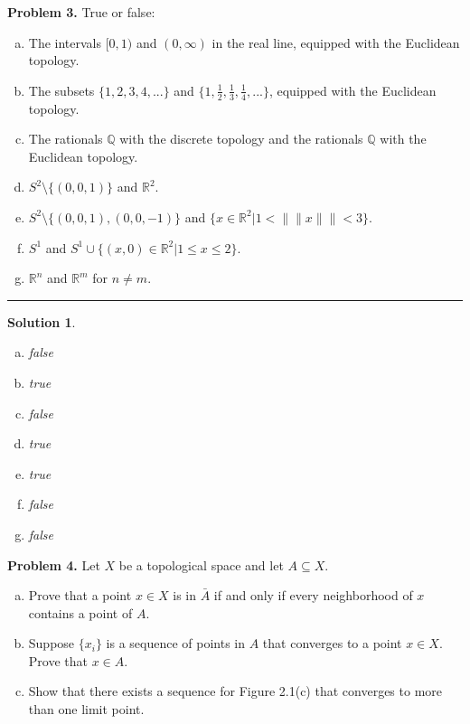 \documentclass[leqno]{article}
\theoremstyle{nonumberplain}
\newtheorem{solution}{Solution}
\begin{document}
\noindent\textbf{Problem 3.} True or false:
\begin{enumerate}[(a)]
\item The intervals $[0,1)$ and $(0,\infty)$ in the real line, equipped with the Euclidean topology.\
\item The subsets $\{1,2,3,4,...\}$ and $\{1,\frac{1}{2},\frac{1}{3},\frac{1}{4},...\}$, equipped with the Euclidean topology.
\item The rationals $\mathbb{Q}$ with the discrete topology and the rationals $\mathbb{Q}$ with the Euclidean topology.
\item $S^2\setminus\{(0,0,1)\}$ and $\mathbb{R}^2$. 
\item $S^2\setminus\{(0,0,1),(0,0,-1)\}$ and $\{x\in \mathbb{R}^2 \vert 1 < \|\|x\|\|<3\}$.
\item $S^1$ and $S^1\cup \{(x,0)\in \mathbb{R}^2 \vert 1\leq x \leq 2\}$.
\item $\mathbb{R}^n$ and $\mathbb{R}^m$ for $n\neq m$.
\end{enumerate}

\noindent\rule[0.5ex]{\linewidth}{1pt}

\begin{solution}
\begin{enumerate}[(a)]
\item false
\item true
\item false
\item true
\item true
\item false
\item false
\end{enumerate}
\end{solution}

\pagebreak





\noindent\textbf{Problem 4.}  Let $X$ be a topological space and let $A\subseteq X$.
\begin{enumerate}[(a)]
\item Prove that a point $x\in X$ is in $\bar{A}$ if and only if every neighborhood of $x$ contains a point of $A$.
\item Suppose $\{x_i\}$ is a sequence of points in $A$ that converges to a point $x\in X$. Prove that $x\in A$.
\item Show that there exists a sequence for Figure 2.1(c) that converges to more than one limit point.
\end{enumerate}
\end{document}
